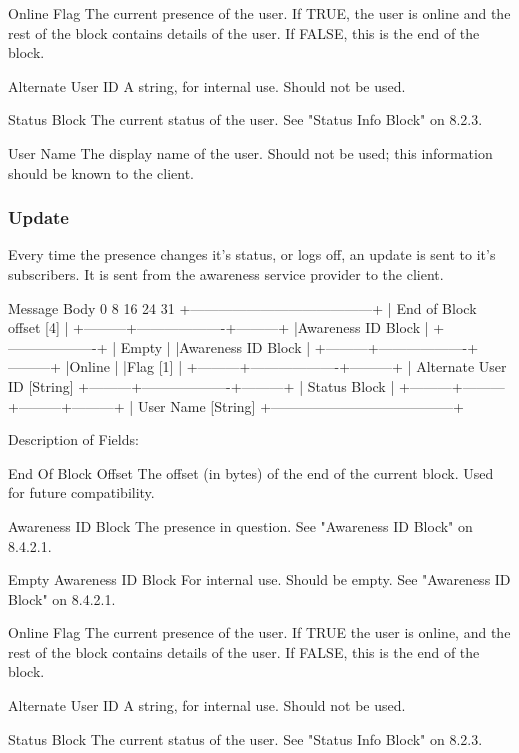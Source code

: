 \documentclass[titlepage,oneside]{book}
\begin{document}
Online Flag
  The current presence of the user. If TRUE, the user is online and
  the rest of the block contains details of the user. If FALSE, this
  is the end of the block.

Alternate User ID
  A string, for internal use. Should not be used.

Status Block
  The current status of the user. See "Status Info Block" on
8.2.3.

User Name
  The display name of the user. Should not be used; this information
  should be known to the client.

\subsubsection{Update}

Every time the presence changes it's status, or logs off, an update is
sent to it's subscribers. It is sent from the awareness service
provider to the client.

Message Body
0         8         16        24      31
+---------------------------------------+
|      End of Block offset [4]          |
+---------+-------------------+---------+
          |Awareness ID Block |
          +-------------------+
          |       Empty       |
          |Awareness ID Block |
+---------+-------------------+---------+
|Online   |
|Flag [1] |
+---------+-------------------+---------+
| Alternate User ID [String]
+---------+-------------------+---------+
          |   Status Block    |
+---------+---------+---------+---------+
| User Name [String]
+---------------------------------------+

Description of Fields:

End Of Block Offset
  The offset (in bytes) of the end of the current block. Used for
  future compatibility.

Awareness ID Block
  The presence in question. See "Awareness ID Block" on
8.4.2.1.

Empty Awareness ID Block
  For internal use. Should be empty. See "Awareness ID Block" on
  8.4.2.1.

Online Flag
  The current presence of the user. If TRUE the user is online, and
  the rest of the block contains details of the user. If FALSE, this
  is the end of the block.

Alternate User ID
  A string, for internal use. Should not be used.

Status Block
  The current status of the user. See "Status Info Block" on
  8.2.3.
\end{document}
